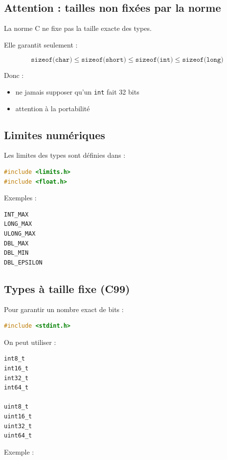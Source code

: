 \subsection{Attention : tailles non fixées par la norme}

La norme C ne fixe pas la taille exacte des types.

Elle garantit seulement :

\[
\texttt{sizeof(char)} \leq \texttt{sizeof(short)} \leq \texttt{sizeof(int)} \leq \texttt{sizeof(long)}
\]

Donc :

\begin{itemize}
    \item ne jamais supposer qu’un \texttt{int} fait 32 bits
    \item attention à la portabilité
\end{itemize}

\subsection{Limites numériques}

Les limites des types sont définies dans :

\begin{lstlisting}[language=C]
#include <limits.h>
#include <float.h>
\end{lstlisting}

Exemples :

\begin{lstlisting}[language=C]
INT_MAX
LONG_MAX
ULONG_MAX
DBL_MAX
DBL_MIN
DBL_EPSILON
\end{lstlisting}

\subsection{Types à taille fixe (C99)}

Pour garantir un nombre exact de bits :

\begin{lstlisting}[language=C]
#include <stdint.h>
\end{lstlisting}

On peut utiliser :

\begin{lstlisting}[language=C]
int8_t
int16_t
int32_t
int64_t

uint8_t
uint16_t
uint32_t
uint64_t
\end{lstlisting}

Exemple :


